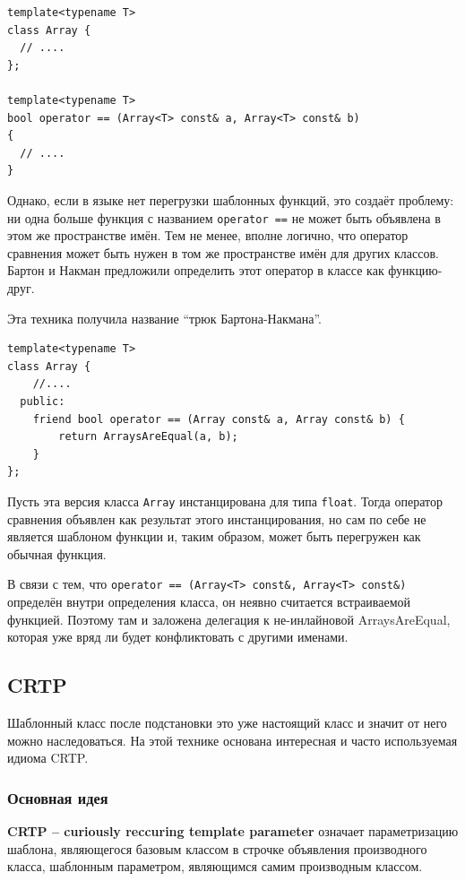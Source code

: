 \documentclass[a4paper,12pt,oneside]{article}
\begin{document}
\begin{lstlisting}
template<typename T> 
class Array { 
  // ....
}; 

template<typename T> 
bool operator == (Array<T> const& a, Array<T> const& b) 
{ 
  // .... 
} 
\end{lstlisting}

Однако, если в языке нет перегрузки шаблонных функций, это создаёт проблему: ни одна больше функция с названием \lstinline!operator ==! не может быть объявлена в этом же пространстве имён. Тем не менее, вполне логично, что оператор сравнения может быть нужен в том же пространстве имён для других классов. Бартон и Накман предложили определить этот оператор в классе как функцию-друг.

Эта техника получила название ``трюк Бартона-Накмана''.

\begin{lstlisting}
template<typename T> 
class Array { 
    //....
  public: 
    friend bool operator == (Array const& a, Array const& b) {
        return ArraysAreEqual(a, b); 
    } 
}; 
\end{lstlisting}

Пусть эта версия класса \lstinline!Array! инстанцирована для типа \lstinline!float!. Тогда оператор сравнения объявлен как результат этого инстанцирования, но сам по себе не является шаблоном функции и, таким образом, может быть перегружен как обычная функция.

В связи с тем, что \lstinline!operator == (Array<T> const&, Array<T> const&)! определён внутри определения класса, он неявно считается встраиваемой функцией. Поэтому там и заложена делегация к не-инлайновой ArraysAreEqual, которая уже вряд ли будет конфликтовать с другими именами.

\pagebreak
\subsection{CRTP}\label{CRTP}

Шаблонный класс после подстановки это уже настоящий класс и значит от него можно наследоваться. На этой технике основана интересная и часто используемая идиома CRTP.

\subsubsection{Основная идея}

\textbf{CRTP – curiously reccuring template parameter} означает параметризацию шаблона, являющегося базовым классом в строчке объявления производного класса, шаблонным параметром, являющимся самим производным классом. 
\end{document}
